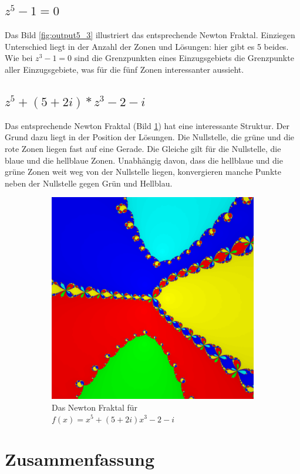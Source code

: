\documentclass[a4paper,12pt]{llncs}
\numberwithin{equation}{section}
\begin{document}
\subsection{$z^5 -1 = 0$}
Das Bild \ref{fig:output5_3} illustriert das entsprechende Newton Fraktal. 
Einziegen Unterschied liegt in der Anzahl der Zonen und Lösungen: hier gibt es 5 beides.
Wie bei $z^3 -1 = 0$ sind die Grenzpunkten eines Einzugsgebiets die Grenzpunkte aller Einzugsgebiete, was für die fünf Zonen interessanter aussieht.

\subsection{$z^5 + (5+2i)*z^3 - 2-i $}
Das entsprechende Newton Fraktal (Bild \ref{fig:output_f7}) hat eine interessante Struktur. 
Der Grund dazu liegt in der Position der Lösungen.
Die Nullstelle, die grüne und die rote Zonen liegen fast auf eine Gerade.
Die Gleiche gilt für die Nullstelle, die blaue und die hellblaue Zonen.
Unabhängig davon, dass die hellblaue und die grüne Zonen weit weg von der Nullstelle liegen, konvergieren manche Punkte neben der Nullstelle gegen Grün und Hellblau.
\begin{figure}[ht]   
	\begin{subfigure}{.5\textwidth}
		\centering
		\includegraphics[width=.7\linewidth]{figures/output_f7}
		\captionsetup{width=0.8\textwidth}
		\caption{Das Newton Fraktal für $f(x)=x^5 + (5+2i)x^3 - 2-i $ }
		\label{fig:output_f7}
	\end{subfigure}%
	\begin{subfigure}{.5\textwidth}

	\end{subfigure}%
\end{figure}
\section{Zusammenfassung}

\fi
\newpage

 

\end{document}
